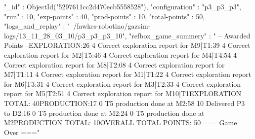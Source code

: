 { "_id" : ObjectId("5297611cc2d470ecb5558528"), "configuration" : "p3_p3_p3", "run" : 10, "exp-points" : 40, "prod-points" : 10, "total-points" : 50, "logs_and_replay" : "~/fawkes-robotino/gazsim-logs/13_11_28_03_10/p3_p3_p3_10", "refbox_game_summery" : " -- Awarded Points --\n EXPLORATION:26   4  Correct exploration report for M9|T1:39   4  Correct exploration report for M2|T5:46   4  Correct exploration report for M4|T4:54   4  Correct exploration report for M8|T2:08   4  Correct exploration report for M7|T1:11   4  Correct exploration report for M1|T1:22   4  Correct exploration report for M6|T3:31   4  Correct exploration report for M3|T2:33   4  Correct exploration report for M5|T2:51   4  Correct exploration report for M10|T1\n EXPLORATION TOTAL: 40\n PRODUCTION:17   0  T5 production done at M2:58  10  Delivered P3 to D2:16   0  T5 production done at M2:24   0  T5 production done at M2\n PRODUCTION TOTAL: 10\n OVERALL TOTAL POINTS: 50\n ===  Game Over  ===\n" }
